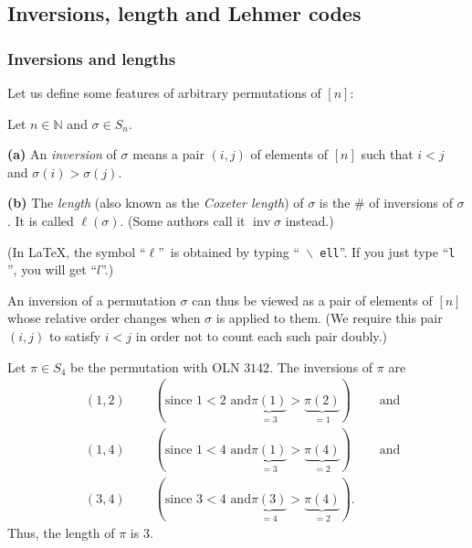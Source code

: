 \subsection{\label{sec.perm.inversions}Inversions, length and Lehmer codes}

\subsubsection{Inversions and lengths}

Let us define some features of arbitrary permutations of $\left[  n\right]  $:

\begin{definition}
\label{def.perm.invs}Let $n\in\mathbb{N}$ and $\sigma\in S_{n}$. \medskip

\textbf{(a)} An \emph{inversion} of $\sigma$ means a pair $\left(  i,j\right)
$ of elements of $\left[  n\right]  $ such that $i<j$ and $\sigma\left(
i\right)  >\sigma\left(  j\right)  $. \medskip

\textbf{(b)} The \emph{length} (also known as the \emph{Coxeter length}) of
$\sigma$ is the \# of inversions of $\sigma$. It is called $\ell\left(
\sigma\right)  $. (Some authors call it $\operatorname*{inv}\sigma$ instead.)
\end{definition}

(In LaTeX, the symbol \textquotedblleft$\ell$\textquotedblright\ is obtained
by typing \textquotedblleft\texttt{%
$\backslash$%
ell}\textquotedblright. If you just type \textquotedblleft\texttt{l}%
\textquotedblright, you will get \textquotedblleft$l$\textquotedblright.)

An inversion of a permutation $\sigma$ can thus be viewed as a pair of
elements of $\left[  n\right]  $ whose relative order changes when $\sigma$ is
applied to them. (We require this pair $\left(  i,j\right)  $ to satisfy $i<j$
in order not to count each such pair doubly.)

\begin{example}
Let $\pi\in S_{4}$ be the permutation with OLN $3142$. The inversions of $\pi$
are%
\begin{align*}
&  \left(  1,2\right)  \ \ \ \ \ \ \ \ \ \ \left(  \text{since }1<2\text{ and
}\underbrace{\pi\left(  1\right)  }_{=3}>\underbrace{\pi\left(  2\right)
}_{=1}\right)  \ \ \ \ \ \ \ \ \ \ \text{and}\\
&  \left(  1,4\right)  \ \ \ \ \ \ \ \ \ \ \left(  \text{since }1<4\text{ and
}\underbrace{\pi\left(  1\right)  }_{=3}>\underbrace{\pi\left(  4\right)
}_{=2}\right)  \ \ \ \ \ \ \ \ \ \ \text{and}\\
&  \left(  3,4\right)  \ \ \ \ \ \ \ \ \ \ \left(  \text{since }3<4\text{ and
}\underbrace{\pi\left(  3\right)  }_{=4}>\underbrace{\pi\left(  4\right)
}_{=2}\right)  .
\end{align*}
Thus, the length of $\pi$ is $3$.
\end{example}

